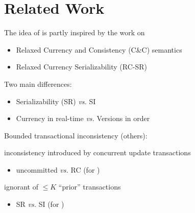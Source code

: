 \section{Related Work}

\begin{frame}{}
  The idea of  is partly inspired by the work on 
  \begin{itemize}
    \item Relaxed Currency and Consistency (C\&C) semantics 
    \item Relaxed Currency Serializability (RC-SR) 
  \end{itemize}

  \vspace{0.80cm}
  Two main differences:
  \begin{itemize}
    \item Serializability (SR) \emph{vs.} SI
    \item Currency in real-time \emph{vs.} Versions in order
  \end{itemize}
\end{frame}

\begin{frame}{}
  Bounded transactional inconsistency (others):
  \begin{description}
    \setlength{\itemsep}{8pt}
    \item[Epsilon-SR] inconsistency introduced by concurrent update transactions
       
      \begin{itemize}
	\item uncommitted \emph{vs.} RC (for \rvsi{})
      \end{itemize}
    \item[$N$-ignorant System] ignorant of $\le K$ ``prior'' transactions
      \begin{itemize}
	\item SR \emph{vs.} SI (for \rvsi{})
      \end{itemize}
  \end{description}
\end{frame}

